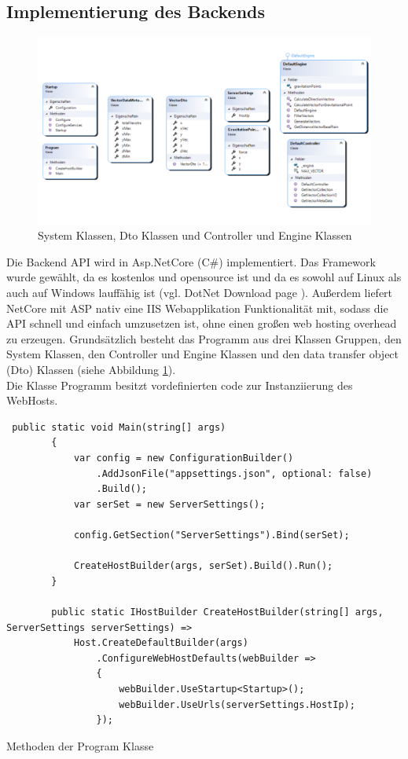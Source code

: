 \subsection{Implementierung des Backends}

\begin{figure}
	\centering
	\includegraphics[width=\linewidth]{images/backend/classDiagram}
	\caption{System Klassen, Dto Klassen und Controller und Engine Klassen}
	\label{fig:ClassDiagram}
\end{figure}

Die Backend API wird in Asp.NetCore (C\#) implementiert. Das Framework wurde gewählt, da es kostenlos und opensource ist und da es sowohl auf Linux als auch auf Windows lauffähig ist (vgl. DotNet Download page \cite{DotNetDownloadPage}). Außerdem liefert NetCore mit ASP nativ eine IIS Webapplikation Funktionalität mit, sodass die API schnell und einfach umzusetzen ist, ohne einen großen web hosting overhead zu erzeugen. Grundsätzlich besteht das Programm aus drei Klassen Gruppen, den System Klassen, den Controller und Engine Klassen und den data transfer object (Dto) Klassen (siehe Abbildung \ref{fig:ClassDiagram}).\\
Die Klasse Programm besitzt vordefinierten code zur Instanziierung des WebHosts.

\begin{codefig}
	\centering
	\lstset{style=sharpc}
	\begin{lstlisting}
 public static void Main(string[] args)
        {
            var config = new ConfigurationBuilder()
                .AddJsonFile("appsettings.json", optional: false)
                .Build();
            var serSet = new ServerSettings();

            config.GetSection("ServerSettings").Bind(serSet);

            CreateHostBuilder(args, serSet).Build().Run();
        }

        public static IHostBuilder CreateHostBuilder(string[] args, ServerSettings serverSettings) =>
            Host.CreateDefaultBuilder(args)
                .ConfigureWebHostDefaults(webBuilder =>
                {
                    webBuilder.UseStartup<Startup>();
                    webBuilder.UseUrls(serverSettings.HostIp);
                });
	\end{lstlisting}
	\caption{Methoden der Program Klasse}
	\label{codefig:Program.cs}
\end{codefig}

